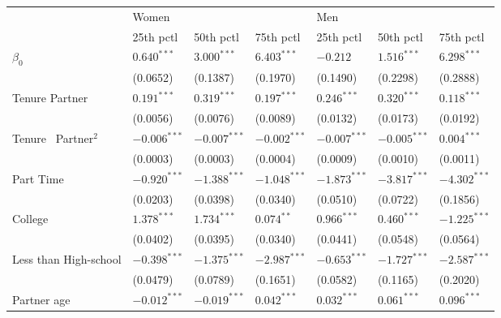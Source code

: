 \begin{tabular}{lllllll}
\toprule
{} & \multicolumn{3}{l}{Women} & \multicolumn{3}{l}{Men} \\
{} &       25th pctl &       50th pctl &       75th pctl &       25th pctl &       50th pctl &       75th pctl \\
\midrule
$\beta_0$                     &   $0.640^{***}$ &   $3.000^{***}$ &   $6.403^{***}$ &        $-0.212$ &   $1.516^{***}$ &   $6.298^{***}$ \\
                              &        (0.0652) &        (0.1387) &        (0.1970) &        (0.1490) &        (0.2298) &        (0.2888) \\
Tenure Partner                &   $0.191^{***}$ &   $0.319^{***}$ &   $0.197^{***}$ &   $0.246^{***}$ &   $0.320^{***}$ &   $0.118^{***}$ \\
                              &        (0.0056) &        (0.0076) &        (0.0089) &        (0.0132) &        (0.0173) &        (0.0192) \\
Tenure \ Partner$^{2}$        &  $-0.006^{***}$ &  $-0.007^{***}$ &  $-0.002^{***}$ &  $-0.007^{***}$ &  $-0.005^{***}$ &   $0.004^{***}$ \\
                              &        (0.0003) &        (0.0003) &        (0.0004) &        (0.0009) &        (0.0010) &        (0.0011) \\
Part Time                     &  $-0.920^{***}$ &  $-1.388^{***}$ &  $-1.048^{***}$ &  $-1.873^{***}$ &  $-3.817^{***}$ &  $-4.302^{***}$ \\
                              &        (0.0203) &        (0.0398) &        (0.0340) &        (0.0510) &        (0.0722) &        (0.1856) \\
College                       &   $1.378^{***}$ &   $1.734^{***}$ &    $0.074^{**}$ &   $0.966^{***}$ &   $0.460^{***}$ &  $-1.225^{***}$ \\
                              &        (0.0402) &        (0.0395) &        (0.0340) &        (0.0441) &        (0.0548) &        (0.0564) \\
Less than High-school         &  $-0.398^{***}$ &  $-1.375^{***}$ &  $-2.987^{***}$ &  $-0.653^{***}$ &  $-1.727^{***}$ &  $-2.587^{***}$ \\
                              &        (0.0479) &        (0.0789) &        (0.1651) &        (0.0582) &        (0.1165) &        (0.2020) \\
Partner age                   &  $-0.012^{***}$ &  $-0.019^{***}$ &   $0.042^{***}$ &   $0.032^{***}$ &   $0.061^{***}$ &   $0.096^{***}$ \\

\end{tabular}
